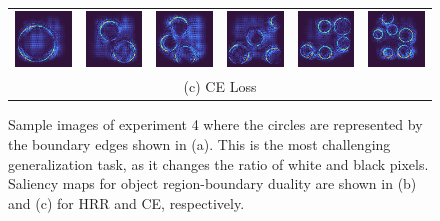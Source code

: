 \documentclass[letterpaper]{article} %
\begin{document}
\begin{figure}[!htbp]
\begin{tabular}{cccccc}
\multicolumn{1}{c}{\includegraphics[width=0.125\columnwidth]{saliency/ce/circle/ring_1.png}} \hspace{-12pt} &  \multicolumn{1}{c}{\includegraphics[width=0.125\columnwidth]{saliency/ce/circle/ring_2.png}} \hspace{-12pt} & \multicolumn{1}{c}{\includegraphics[width=0.125\columnwidth]{saliency/ce/circle/ring_3.png}} \hspace{-12pt} & \multicolumn{1}{c}{\includegraphics[width=0.125\columnwidth]{saliency/ce/circle/ring_4.png}} \hspace{-12pt} & \multicolumn{1}{c}{\includegraphics[width=0.125\columnwidth]{saliency/ce/circle/ring_5.png}} \hspace{-12pt} & \multicolumn{1}{c}{\includegraphics[width=0.125\columnwidth]{saliency/ce/circle/ring_6.png}} \\
\multicolumn{6}{c}{(c) CE Loss}
\end{tabular}
\caption{Sample images of experiment 4 where the circles are represented by the boundary edges shown in (a). This is the most challenging generalization task, as it changes the ratio of white and black pixels. Saliency maps for object region-boundary duality are shown in (b) and (c) for HRR and CE, respectively.}
\label{fig:exp_4_saliency}
\end{figure}
\end{document}
